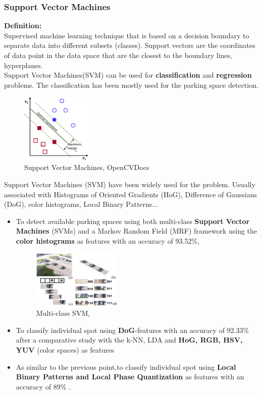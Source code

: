 \documentclass{beamer}
\begin{document}
\begin{frame}[allowframebreaks]
\frametitle{Support Vector Machines}
\textbf{Definition:}\\
Supervised machine learning technique that is based on a decision boundary to separate data into different subsets (classes). Support vectors are the coordinates of data point in the data space that are the closest to the boundary lines, hyperplanes.\\
Support Vector Machines(SVM) can be used for \textbf{classification} and \textbf{regression} problems. The classification has been mostly used for the parking space detection.

\begin{figure}[h!]
	\centering
	\includegraphics[width=0.3\textwidth]{Pictures/SVM}
	\caption{Support Vector Machines, OpenCVDocs}
\end{figure}

Support Vector Machines (SVM) have been widely used for the problem. Usually associated with Histograms of Oriented Gradients (HoG), Difference of Gaussians (DoG), color histograms, Local Binary Patterns...

\begin{itemize}
	\item To detect available parking spaces using both multi-class \textbf{Support Vector Machines} (SVMs) and a Markov Random Field (MRF) framework using the \textbf{color histograms} as features \cite{wu} with an accuracy of 93.52\%,
	\begin{figure}[h!]
		\centering
		\includegraphics[width=0.4\textwidth]{Pictures/Wu}
		\caption{Multi-class SVM, \cite{wu}}
	\end{figure}
	\item To classify individual spot using \textbf{DoG}-features with an accuracy of 92.33\% after a comparative study with the k-NN, LDA and \textbf{HoG, RGB, HSV, YUV} (color spaces) as features \cite{Tschentscher}
	\item As similar to the previous point,to classify individual spot using \textbf{Local Binary Patterns and Local Phase Quantization} as features with an accuracy of 89\% \cite{deAlmeida}.
	

\end{itemize}
\end{frame}
\end{document}
